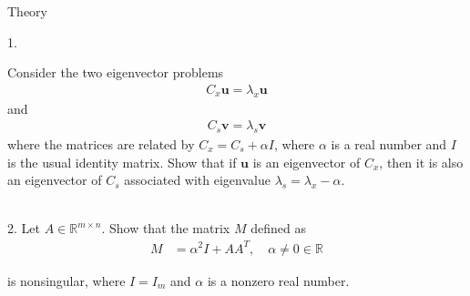 \begin{section}{Theory}

\begin{homeworkSection}{1. }

Consider the two eigenvector problems
\begin{align*}
	C_x \bm{u} = \lambda_x \bm{u}
\end{align*}
and
\begin{align*}
	C_s \bm{v} = \lambda_s \bm{v}
\end{align*}
where the matrices are related by $C_x = C_s + \alpha I$, where $\alpha$ is a real number and $I$ is the usual identity matrix. Show that if $\bm{u}$ is an eigenvector of $C_x$, then it is also an eigenvector of $C_s$ associated with eigenvalue $\lambda_s = \lambda_x -\alpha$.
\\
\\

\end{homeworkSection}

\begin{homeworkSection}{2. }
Let $A \in \mathbb{R}^{m \times n}$. Show that the matrix $M$ defined as
\begin{align*}
	M &= \alpha^2 I + AA^T, \quad  \alpha \neq 0 \in \mathbb{R}
\end{align*}

is nonsingular, where $I = I_m$ and $\alpha$ is a nonzero real number.
\\
\\

\end{homeworkSection}


\end{section}
